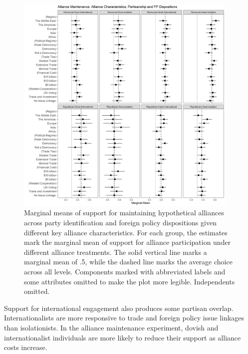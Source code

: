 \documentclass[12pt]{article}
\begin{document}
\begin{figure}[htpb]
	\centering
		\includegraphics[width=0.95\textwidth]{party-dispo-main-char.png}
	\caption{Marginal means of support for maintaining hypothetical alliances across party identification and foreign policy dispositions given different key alliance characteristics. For each group, the estimates mark the marginal mean of support for alliance participation under different alliance treatments. The solid vertical line marks a marginal mean of .5, while the dashed line marks the average choice across all levels. Components marked with abbreviated labels and some attributes omitted to make the plot more legible. Independents omitted.}
	\label{fig:party-dispo-main-char}
\end{figure}


Support for international engagement also produces some partisan overlap. 
Internationalists are more responsive to trade and foreign policy issue linkages than isolationists. 
In the alliance maintenance experiment, dovish and internationalist individuals are more likely to reduce their support as alliance costs increase.


\end{document}
